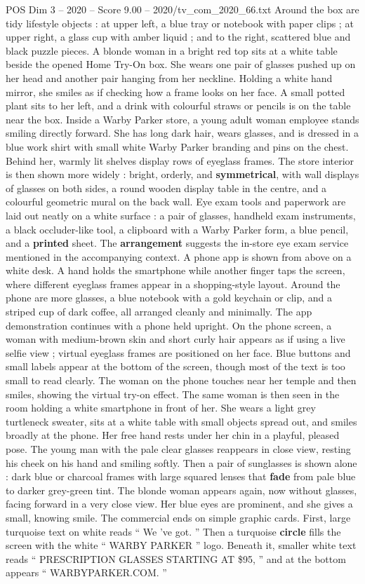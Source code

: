 \begin{textsample}{POS Dim 3 – 2020 – Score 9.00 – 2020/tv\_com\_2020\_66.txt}
Around the box are tidy lifestyle objects : at upper left, a blue tray or notebook with paper clips ; at upper right, a glass cup with amber liquid ; and to the right, scattered blue and black puzzle pieces.
A blonde woman in a bright red top sits at a white table beside the opened Home Try-On box.
She wears one pair of glasses pushed up on her head and another pair hanging from her neckline.
Holding a white hand mirror, she smiles as if checking how a frame looks on her face.
A small potted plant sits to her left, and a drink with colourful straws or pencils is on the table near the box.
Inside a Warby Parker store, a young adult woman employee stands smiling directly forward.
She has long dark hair, wears glasses, and is dressed in a blue work shirt with small white Warby Parker branding and pins on the chest.
Behind her, warmly lit shelves display rows of eyeglass frames.
The store interior is then shown more widely : bright, orderly, and \textbf{symmetrical}, with wall displays of glasses on both sides, a round wooden display table in the centre, and a colourful geometric mural on the back wall.
Eye exam tools and paperwork are laid out neatly on a white surface : a pair of glasses, handheld exam instruments, a black occluder-like tool, a clipboard with a Warby Parker form, a blue pencil, and a \textbf{printed} sheet.
The \textbf{arrangement} suggests the in-store eye exam service mentioned in the accompanying context.
A phone app is shown from above on a white desk.
A hand holds the smartphone while another finger taps the screen, where different eyeglass frames appear in a shopping-style layout.
Around the phone are more glasses, a blue notebook with a gold keychain or clip, and a striped cup of dark coffee, all arranged cleanly and minimally.
The app demonstration continues with a phone held upright.
On the phone screen, a woman with medium-brown skin and short curly hair appears as if using a live selfie view ; virtual eyeglass frames are positioned on her face.
Blue buttons and small labels appear at the bottom of the screen, though most of the text is too small to read clearly.
The woman on the phone touches near her temple and then smiles, showing the virtual try-on effect.
The same woman is then seen in the room holding a white smartphone in front of her.
She wears a light grey turtleneck sweater, sits at a white table with small objects spread out, and smiles broadly at the phone.
Her free hand rests under her chin in a playful, pleased pose.
The young man with the pale clear glasses reappears in close view, resting his cheek on his hand and smiling softly.
Then a pair of sunglasses is shown alone : dark blue or charcoal frames with large squared lenses that \textbf{fade} from pale blue to darker grey-green tint.
The blonde woman appears again, now without glasses, facing forward in a very close view.
Her blue eyes are prominent, and she gives a small, knowing smile.
The commercial ends on simple graphic cards.
First, large turquoise text on white reads “ We ’ve got. ” Then a turquoise \textbf{circle} fills the screen with the white “ WARBY PARKER ” logo.
Beneath it, smaller white text reads “ PRESCRIPTION GLASSES STARTING AT \$95, ” and at the bottom appears “ WARBYPARKER.COM. ”


\end{textsample}
